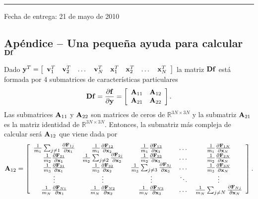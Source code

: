 \vskip 15pt
\hrule
\vskip 11pt

Fecha de entrega: 21 de mayo de 2010

\newpage 
\subsection*{Apéndice -- Una pequeña ayuda para calcular ${\bf Df}$}

Dado ${\bf y}^T = \left[
\begin{array}{cccccccc}
{\bf v}_1^T & {\bf v}_2^T & \dots & {\bf v}_N^T & {\bf x}_1^T & {\bf x}_2^T & \dots & {\bf x}_N^T
\end{array}
\right]$ la matriz ${\bf Df}$ está formada por 4 submatrices de características particulares
\begin{equation*}
 {\bf Df} = \frac{\partial {\bf f}}{\partial {\bf y}} = \left[
 \begin{array}{cc}
 {\bf A}_{11} & {\bf A}_{12} \\
 {\bf A}_{21} & {\bf A}_{22}
\end{array} \right].
\end{equation*}
Las submatrices ${\bf A}_{11}$ y ${\bf A}_{22}$ son matrices de ceros de $\mathbb{R}^{3N \times 3N}$ y la submatriz ${\bf A}_{21}$ es la matriz identidad de $\mathbb{R}^{3N \times 3N}$. Entonces, la submatriz más compleja de calcular será ${\bf A}_{12}$ que viene dada por
\begin{equation*}
 {\bf A}_{12} = \left[
 \begin{array}{ccccc}
  \frac{1}{m_1} \sum_{j \neq 1} \frac{\partial {\bf F}_{1j}}{\partial {\bf x}_1} & \frac{1}{m_1} \frac{\partial {\bf F}_{12}}{\partial {\bf x}_2} & \frac{1}{m_1} \frac{\partial {\bf F}_{13}}{\partial {\bf x}_3} & \dots & \frac{1}{m_1} \frac{\partial {\bf F}_{1N}}{\partial {\bf x}_N} \\
  \frac{1}{m_2} \frac{\partial {\bf F}_{21}}{\partial {\bf x}_1} & \frac{1}{m_2} \sum_{j \neq 2} \frac{\partial {\bf F}_{2j}}{\partial {\bf x}_2} & \frac{1}{m_2} \frac{\partial {\bf F}_{23}}{\partial {\bf x}_3} & \dots & \frac{1}{m_2} \frac{\partial {\bf F}_{2N}}{\partial {\bf x}_N} \\
  \frac{1}{m_3} \frac{\partial {\bf F}_{31}}{\partial {\bf x}_1} & \frac{1}{m_3} \frac{\partial {\bf F}_{32}}{\partial {\bf x}_2} & \frac{1}{m_3} \sum_{j \neq 3} \frac{\partial {\bf F}_{3j}}{\partial {\bf x}_3} & \dots & \frac{1}{m_3} \frac{\partial {\bf F}_{3N}}{\partial {\bf x}_N} \\
  \vdots & \vdots & \vdots & \ddots & \vdots \\
  \frac{1}{m_N} \frac{\partial {\bf F}_{N1}}{\partial {\bf x}_1} & \frac{1}{m_N} \frac{\partial {\bf F}_{N2}}{\partial {\bf x}_2} & \frac{1}{m_N} \frac{\partial {\bf F}_{N3}}{\partial {\bf x}_3} & \dots & \frac{1}{m_N} \sum_{j \neq N} \frac{\partial {\bf F}_{Nj}}{\partial {\bf x}_N}
 \end{array}
 \right].
\end{equation*}

